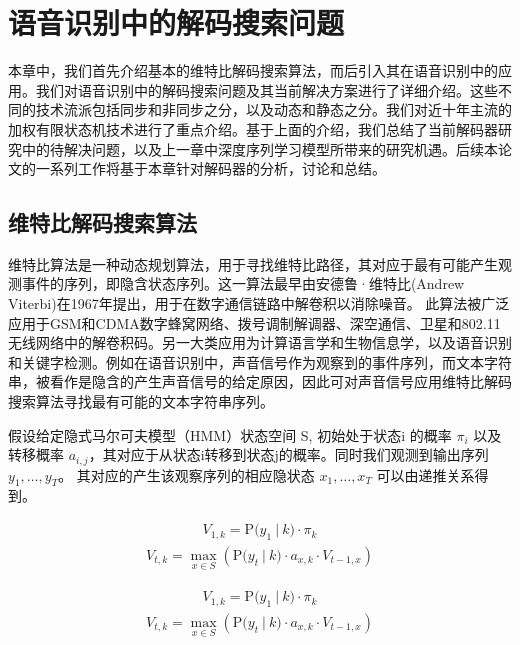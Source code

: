 
\chapter{语音识别中的解码搜索问题}
\label{chap:intro2}

本章中，我们首先介绍基本的维特比解码搜索算法，而后引入其在语音识别中的应用。我们对语音识别中的解码搜索问题及其当前解决方案进行了详细介绍。这些不同的技术流派包括同步和非同步之分，以及动态和静态之分。我们对近十年主流的加权有限状态机技术进行了重点介绍。基于上面的介绍，我们总结了当前解码器研究中的待解决问题，以及上一章中深度序列学习模型所带来的研究机遇。后续本论文的一系列工作将基于本章针对解码器的分析，讨论和总结。


\section{维特比解码搜索算法}
\label{chap:intro2-viterbi}

维特比算法是一种动态规划算法，用于寻找维特比路径，其对应于最有可能产生观测事件的序列，即隐含状态序列。这一算法最早由安德鲁·维特比(Andrew Viterbi)在1967年提出，用于在数字通信链路中解卷积以消除噪音。 此算法被广泛应用于GSM和CDMA数字蜂窝网络、拨号调制解调器、深空通信、卫星和802.11无线网络中的解卷积码。另一大类应用为计算语言学和生物信息学，以及语音识别和关键字检测。例如在语音识别中，声音信号作为观察到的事件序列，而文本字符串，被看作是隐含的产生声音信号的给定原因，因此可对声音信号应用维特比解码搜索算法寻找最有可能的文本字符串序列。

假设给定隐式马尔可夫模型（HMM）状态空间 S, 初始处于状态i 的概率 $\pi_{i}$ 以及转移概率 $a_{i,j}$，其对应于从状态i转移到状态j的概率。同时我们观测到输出序列 $y_{1},\dots ,y_{T}$。 其对应的产生该观察序列的相应隐状态 $x_{1},\dots ,x_{T}$ 可以由递推关系得到。

\begin{equation}
\begin{split}
V_{1,k}=\mathrm {P} {\big (}y_{1}\ |\ k{\big )}\cdot \pi _{k}
\end{split}
\end{equation}
\begin{equation}
\begin{split}
V_{t,k}=\max _{x\in S}\left(\mathrm {P} {\big (}y_{t}\ |\ k{\big )}\cdot a_{x,k}\cdot V_{t-1,x}\right)
\end{split}
\end{equation}

\begin{equation}
\begin{split}
V_{1,k}=\mathrm {P} {\big (}y_{1}\ |\ k{\big )}\cdot \pi _{k}
\end{split}
\end{equation}
\begin{equation}
\begin{split}
V_{t,k}=\max _{x\in S}\left(\mathrm {P} {\big (}y_{t}\ |\ k{\big )}\cdot a_{x,k}\cdot V_{t-1,x}\right)
\end{split}
\end{equation}

